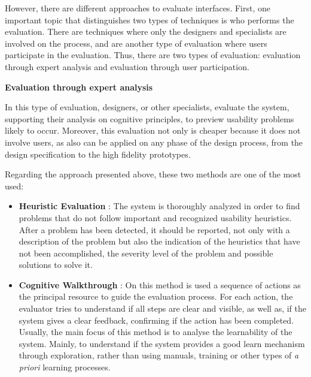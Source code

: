 However, there are different approaches to evaluate interfaces. First, one important topic that distinguishes two types of techniques is who performs the evaluation. There are techniques where only the designers and specialists are involved on the process, and are another type of evaluation where users participate in the evaluation. \cite{humanComputerInteraction} Thus, there are two types of evaluation: evaluation through expert analysis and evaluation through user participation.

\bigskip

\textbf{Evaluation through expert analysis}

In this type of evaluation, designers, or other specialists, evaluate the system, supporting their analysis on cognitive principles, to preview usability problems likely to occur. Moreover, this evaluation not only is cheaper because it does not involve users, as also can be applied on any phase of the design process, from the design specification to the high fidelity prototypes. \cite{humanComputerInteraction}

Regarding the approach presented above, these two methods are one of the most used:

\begin{itemize}
	\item \textbf{Heuristic Evaluation} \cite{heuristicEvaluationOfUserInterfaces}: The system is thoroughly analyzed in order to find problems that do not follow important and recognized usability heuristics. After a problem has been detected, it should be reported, not only with a description of the problem but also the indication of the heuristics that have not been accomplished, the severity level of the problem and possible solutions to solve it. \cite{usabilityEngineering}
	\item \textbf{Cognitive Walkthrough} \cite{cognitiveWalkthroughs}: On this method is used a sequence of actions as the principal resource to guide the evaluation process. For each action, the evaluator tries to understand if all steps are clear and visible, as well as, if the system gives a clear feedback, confirming if the action has been completed. Usually, the main focus of this method is to analyse the learnability of the system. Mainly, to understand if the system provides a good learn mechanism through exploration, rather than using manuals, training or other types of \textit{a priori} learning processes. \cite{humanComputerInteraction}
\end{itemize}


